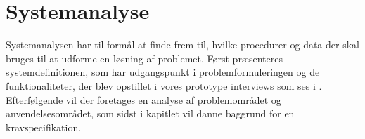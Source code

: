 \chapter{Systemanalyse}\label{chapter:systemanalyse}
Systemanalysen har til formål at finde frem til, hvilke procedurer og data der skal bruges til at udforme en løsning af problemet.
Først præsenteres systemdefinitionen, som har udgangspunkt i problemformuleringen og de funktionaliteter, der blev opstillet i vores prototype interviews som ses i .
Efterfølgende vil der foretages en analyse af problemområdet og anvendelsesområdet, som sidst i kapitlet vil danne baggrund for en kravspecifikation.






